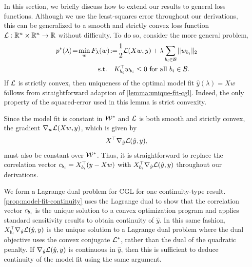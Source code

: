 
In this section, we briefly discuss how to extend our results to general loss
functions.
Although we use the least-squares error throughout our derivations, this can be
generalized to a smooth and strictly convex loss function \( \mathcal{L} : \mathbb{R}^n \times \mathbb{R}^n \rightarrow \mathbb{R} \)
without difficulty.
To do so, consider the more general problem,
\begin{equation}\label{eq:general-gl}
	\begin{aligned}
		p^*(\lambda) \!=\! \min_{w} \,
		 & F_\lambda(w) \!:=\! \frac 1 2 \mathcal{L}(X w, y) + \lambda \sum_{{b_i} \in \mathcal{B}} \|w_{b_i}\|_2 \\
		 & \quad \text{s.t.} \quad K_{{b_i}}^\top w_{b_i} \leq 0  \text{ for all } {b_i} \in \mathcal{B}.
	\end{aligned}
\end{equation}
If \( \mathcal{L} \) is strictly convex, then uniqueness of the
optimal model fit \( \hat y(\lambda) = X w \) follows from straightforward
adaption of \cref{lemma:unique-fit-cgl}.
Indeed, the only property of the squared-error used in this lemma is strict
convexity.

Since the model fit is constant in \( \mathcal{W}^* \) and \( \mathcal{L} \) is both smooth and strictly convex,
the gradient \( \nabla_w \mathcal{L}( X w, y) \), which is given by
\[
	X^\top \nabla_{\hat y} \mathcal{L}( \hat y, y),
\]
must also be constant over \( \mathcal{W}^* \).
Thus, it is straightforward to replace the correlation vector \( c_{b_i} = X_{b_i}^\top (y - X w) \) with \( X_{b_i}^\top \nabla_{\hat y} \mathcal{L}(\hat y, y) \)
throughout our derivations.

We form a Lagrange dual problem for CGL for one continuity-type result.
\cref{prop:model-fit-continuity} uses the Lagrange dual to
show that the correlation vector \( c_{b_i} \) is the unique solution to a convex
optimization program and applies standard sensitivity results to obtain continuity
of \( \hat y \).
In this same fashion, \( X_{b_i}^\top \nabla_{\hat y} \mathcal{L}(\hat y, y) \) is the
unique solution to a Lagrange dual problem where the dual objective uses
the convex conjugate \( \mathcal{L}^* \), rather than the dual of the quadratic penalty.
If \( \nabla_{\hat y} \mathcal{L}(\hat y, y) \) is continuous in \( \hat y \), then
this is sufficient to deduce continuity of the model fit using the same
argument.
